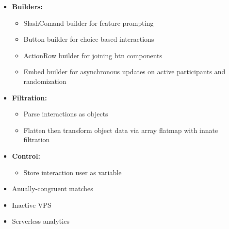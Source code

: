 \documentclass[7px]{article}
\begin{document}
{
  \begin{itemize}[label=\textsection]
    \item {\textbf{Builders:}}
      \small
      \begin{itemize}[label=$\multimapdotinv$, leftmargin=3mm]
        \item SlashComand builder for feature prompting
        \item Button builder for choice-based interactions
        \item ActionRow builder for joining btn components
        \item Embed builder for asynchronous updates on active participants and randomization
      \end{itemize}
      \normalsize
    \item \textbf{Filtration:}
      \small 
      \begin{itemize}[label=$\multimapdotinv$, leftmargin=3mm]
        \item Parse interactions as objects
        \item Flatten then transform object data via array flatmap with innate filtration
      \end{itemize}
      \normalsize
    \item \textbf{Control: }
      \small
      \begin{itemize}[label=$\multimapdotinv$, leftmargin=3mm]
        \item Store interaction user as variable
      \end{itemize}
      \normalsize
  \end{itemize}
}
{
  \raggedright
  \begin{itemize}[label=\blitzb]
    \small
    \item Anually-congruent matches
    \item Inactive VPS
    \item Serverless analytics
  \end{itemize}
}
\end{document}
